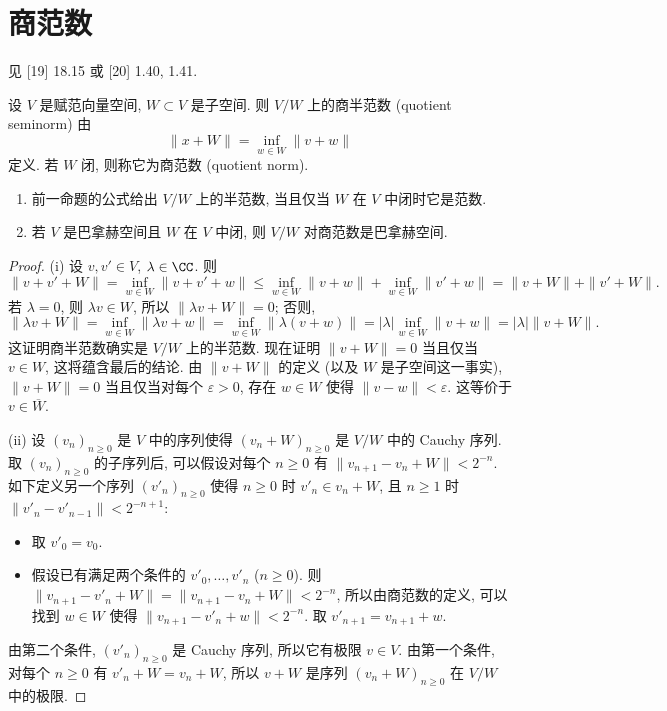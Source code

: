 
\section{商范数}
见 {[}19{]} 18.15 或 {[}20{]} 1.40, 1.41.

\begin{definition}
\label{def:B.1.1}
设 $V$ 是赋范向量空间, $W \subset V$ 是子空间. 则 $V/W$ 上的商半范数 (quotient seminorm) 由
\[
\|x + W\| = \inf_{w \in W}\|v + w\|
\]
定义.
若 $W$ 闭, 则称它为商范数 (quotient norm).
\end{definition}

\begin{proposition}[商空间的性质]
\label{prop:B.1.2}
\begin{enumerate}
\item[(i)] 前一命题的公式给出 $V/W$ 上的半范数, 当且仅当 $W$ 在 $V$ 中闭时它是范数.
\item[(ii)] 若 $V$ 是巴拿赫空间且 $W$ 在 $V$ 中闭, 则 $V/W$ 对商范数是巴拿赫空间.
\end{enumerate}
\end{proposition}

\begin{proof}
(i) 设 $v, v' \in V$, $\lambda \in \CC$. 则
\[
\|v + v' + W\| = \inf_{w \in W}\|v + v' + w\| \leq \inf_{w \in W}\|v + w\| + \inf_{w \in W}\|v' + w\| = \|v + W\| + \|v' + W\|.
\]
若 $\lambda = 0$, 则 $\lambda v \in W$, 所以 $\|\lambda v + W\| = 0$; 否则,
\[
\|\lambda v + W\| = \inf_{w \in W}\|\lambda v + w\| = \inf_{w \in W}\|\lambda(v + w)\| = |\lambda|\inf_{w \in W}\|v + w\| = |\lambda|\|v + W\|.
\]
这证明商半范数确实是 $V/W$ 上的半范数. 现在证明 $\|v + W\| = 0$ 当且仅当 $v \in W$, 这将蕴含最后的结论. 由 $\|v + W\|$ 的定义 (以及 $W$ 是子空间这一事实), $\|v + W\| = 0$ 当且仅当对每个 $\varepsilon > 0$, 存在 $w \in W$ 使得 $\|v - w\| < \varepsilon$. 这等价于 $v \in \overline{W}$.

(ii) 设 $(v_n)_{n \geq 0}$ 是 $V$ 中的序列使得 $(v_n + W)_{n \geq 0}$ 是 $V/W$ 中的 Cauchy 序列. 取 $(v_n)_{n \geq 0}$ 的子序列后, 可以假设对每个 $n \geq 0$ 有 $\|v_{n+1} - v_n + W\| < 2^{-n}$. 如下定义另一个序列 $(v'_n)_{n \geq 0}$ 使得 $n \geq 0$ 时 $v'_n \in v_n + W$, 且 $n \geq 1$ 时 $\|v'_n - v'_{n-1}\| < 2^{-n+1}$:
\begin{itemize}
\item 取 $v'_0 = v_0$.
\item 假设已有满足两个条件的 $v'_0, \ldots, v'_n$ ($n \geq 0$). 则 $\|v_{n+1} - v'_n + W\| = \|v_{n+1} - v_n + W\| < 2^{-n}$, 所以由商范数的定义, 可以找到 $w \in W$ 使得 $\|v_{n+1} - v'_n + w\| < 2^{-n}$. 取 $v'_{n+1} = v_{n+1} + w$.
\end{itemize}
由第二个条件, $(v'_n)_{n \geq 0}$ 是 Cauchy 序列, 所以它有极限 $v \in V$. 由第一个条件, 对每个 $n \geq 0$ 有 $v'_n + W = v_n + W$, 所以 $v + W$ 是序列 $(v_n + W)_{n \geq 0}$ 在 $V/W$ 中的极限.
\end{proof}

